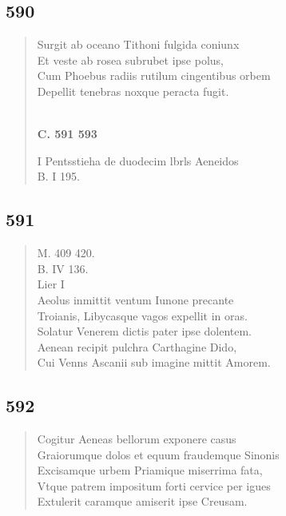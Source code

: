 \documentclass[11pt, a4paper]{report}
\begin{document}
            \subsection*{590}
      \begin{verse}
      Surgit ab oceano Tithoni fulgida coniunx \\ Et veste ab rosea subrubet ipse polus, \\ Cum Phoebus radiis rutilum cingentibus orbem \\ Depellit tenebras noxque peracta fugit. \\ 
        ﻿\pagebreak 
    \begin{center} \textbf{C. 591 593} \end{center} \marginpar{[83]} I Pentsstieha de duodecim lbrls Aeneidos \\ B. I 195. \\ 
      \end{verse}
  
            \subsection*{591}
      \begin{verse}
      M. 409 420. \\ B. IV 136. \\ Lier I \\ Aeolus inmittit ventum Iunone precante \\ Troianis, Libycasque vagos expellit in oras. \\ Solatur Venerem dictis pater ipse dolentem. \\ Aenean recipit pulchra Carthagine Dido, \\ Cui Venns Ascanii sub imagine mittit Amorem. \\ 
      \end{verse}
  
            \subsection*{592}
      \begin{verse}
      Cogitur Aeneas bellorum exponere casus \\ Graiorumque dolos et equum fraudemque Sinonis \\ Excisamque urbem Priamique miserrima fata, \\ Vtque patrem impositum forti cervice per igues \\ Extulerit caramque amiserit ipse Creusam. \\ 
      \end{verse}
  
\end{document}
